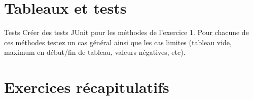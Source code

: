 \documentclass[a4paper,11pt]{article}
\begin{document}
	
	

\section{Tableaux et tests}


	\begin{Exercice}{Tests}	
		Créer des tests JUnit pour les méthodes de l'exercice 1. Pour chacune 
		de ces méthodes testez un cas général ainsi que les cas limites (tableau vide,
		maximum en début/fin de tableau, valeurs négatives, etc).
	\end{Exercice}

\section{Exercices récapitulatifs}
\end{document}
